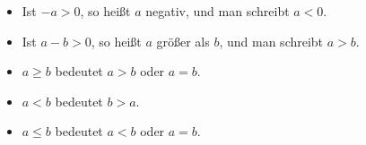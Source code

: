 \begin{itemize}[leftmargin=*]
    \item Ist $-a > 0$, so heißt $a$ negativ, und man schreibt $a < 0$.
    \item Ist $a-b > 0$, so heißt $a$ größer als $b$, und man schreibt $a > b$.
    \item $a \geq b$ bedeutet $a > b$ oder $a = b$.
    \item $a < b$ bedeutet $b > a$.
    \item $a \leq b$ bedeutet $a < b$ oder $a = b$.
\end{itemize}